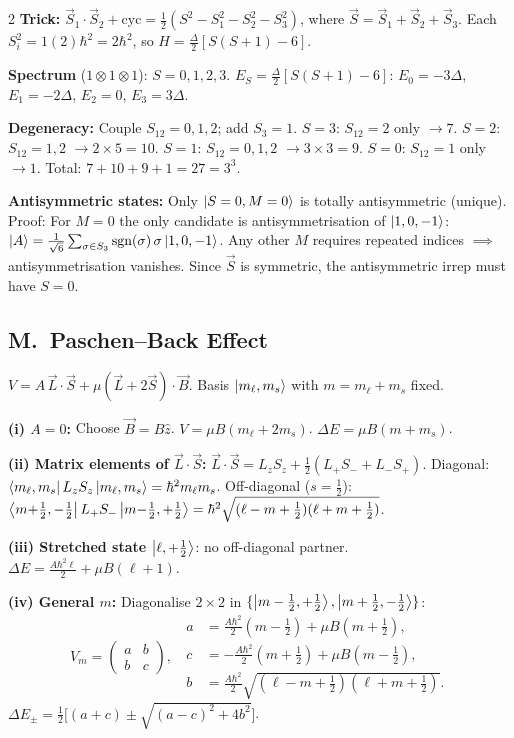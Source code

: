 \documentclass[9pt,a4paper]{article} %
\begin{document}
\begin{multicols}{2}
\textbf{Trick:} $\vec{S}_1\!\cdot\!\vec{S}_2+\text{cyc}=\frac{1}{2}(S^2-S_1^2-S_2^2-S_3^2)$, where $\vec{S}=\vec{S}_1+\vec{S}_2+\vec{S}_3$.
Each $S_i^2=1(2)\hbar^2=2\hbar^2$, so $H=\frac{\Delta}{2}[S(S+1)-6]$.

\textbf{Spectrum} ($1\otimes1\otimes1$): $S=0,1,2,3$.
$E_S=\frac{\Delta}{2}[S(S+1)-6]$: $E_0=-3\Delta$, $E_1=-2\Delta$, $E_2=0$, $E_3=3\Delta$.

\textbf{Degeneracy:}
Couple $S_{12}=0,1,2$; add $S_3=1$.
$S=3$: $S_{12}=2$ only $\to 7$.
$S=2$: $S_{12}=1,2$ $\to 2\times 5=10$.
$S=1$: $S_{12}=0,1,2$ $\to 3\times 3=9$.
$S=0$: $S_{12}=1$ only $\to 1$.\;
Total: $7+10+9+1=27=3^3$.\;\checkmark

\textbf{Antisymmetric states:}
Only $\ket{S=0,M=0}$ is totally antisymmetric (unique).
Proof: For $M=0$ the only candidate is antisymmetrisation of $\ket{1,0,-1}$:
$\ket{A}=\frac{1}{\sqrt{6}}\sum_{\sigma\in S_3}\text{sgn}(\sigma)\,\sigma\ket{1,0,-1}$.
Any other $M$ requires repeated indices $\implies$ antisymmetrisation vanishes.
Since $\vec{S}$ is symmetric, the antisymmetric irrep must have $S=0$.

\subsection{M.\ Paschen--Back Effect}
$V=A\,\vec{L}\!\cdot\!\vec{S}+\mu(\vec{L}+2\vec{S})\cdot\vec{B}$.\;
Basis $\ket{m_\ell,m_s}$ with $m=m_\ell+m_s$ fixed.

\textbf{(i) $A=0$:} Choose $\vec{B}=B\hat{z}$. $V=\mu B(m_\ell+2m_s)$.\;
$\Delta E=\mu B(m+m_s)$.

\textbf{(ii) Matrix elements of $\vec{L}\!\cdot\!\vec{S}$:}
$\vec{L}\!\cdot\!\vec{S}=L_zS_z+\frac{1}{2}(L_+S_-+L_-S_+)$.\;
Diagonal: $\bra{m_\ell,m_s}L_zS_z\ket{m_\ell,m_s}=\hbar^2 m_\ell m_s$.
Off-diagonal ($s=\frac{1}{2}$): $\bra{m{+}\frac{1}{2},-\frac{1}{2}}L_+S_-\ket{m{-}\frac{1}{2},+\frac{1}{2}}=\hbar^2\sqrt{(\ell-m+\tfrac{1}{2})(\ell+m+\tfrac{1}{2})}$.

\textbf{(iii) Stretched state} $\ket{\ell,+\frac{1}{2}}$: no off-diagonal partner.
$\Delta E=\frac{A\hbar^2\ell}{2}+\mu B(\ell+1)$.

\textbf{(iv) General $m$:} Diagonalise $2\times 2$ in $\{\ket{m-\frac{1}{2},+\frac{1}{2}},\ket{m+\frac{1}{2},-\frac{1}{2}}\}$:
\[
V_m=\begin{pmatrix}a&b\\b&c\end{pmatrix},\;\;
\begin{aligned}
a&=\tfrac{A\hbar^2}{2}(m{-}\tfrac{1}{2})+\mu B(m{+}\tfrac{1}{2}),\\
c&=-\tfrac{A\hbar^2}{2}(m{+}\tfrac{1}{2})+\mu B(m{-}\tfrac{1}{2}),\\
b&=\tfrac{A\hbar^2}{2}\sqrt{(\ell-m+\tfrac{1}{2})(\ell+m+\tfrac{1}{2})}.
\end{aligned}
\]
$\boxed{\Delta E_\pm=\tfrac{1}{2}\bigl[(a+c)\pm\sqrt{(a-c)^2+4b^2}\bigr]}$.


\end{multicols}
\end{document}
